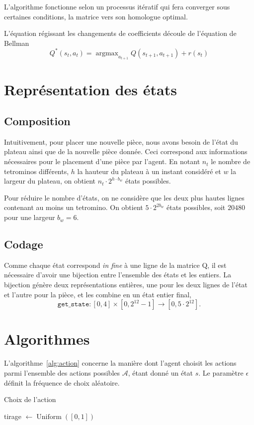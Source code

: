 \documentclass{report}
\DeclareMathOperator{\argmax}{argmax}
\DeclareMathOperator{\uniform}{Uniform}
\begin{document}
L'algorithme fonctionne selon un processus itératif qui fera converger sous
certaines conditions, la matrice vers son homologue optimal.

L'équation régissant les changements de coefficients découle de l'équation de
Bellman\cite{mengin}
\[
  Q^*(s_t, a_t) = \argmax_{a_{t+1}}Q(s_{t+1}, a_{t+1}) + r(s_t)
\]

\section{Représentation des états}

\subsection{Composition}
Intuitivement, pour placer une nouvelle pièce, nous avons besoin de l'état du
plateau ainsi que de la nouvelle pièce donnée. Ceci correspond aux informations
nécessaires pour le placement d'une pièce par l'agent. En notant \(n_t\) le nombre de tetrominos
différents, \( h \) la hauteur du plateau à un instant considéré  et \(w\) la
largeur du plateau, on obtient \(n_t \cdot 2^{h \cdot b_w}\) états possibles.

Pour réduire le nombre d'états, on ne considère que les deux plus hautes lignes
contenant au moins un tetromino. On obtient \(5\cdot 2^{2 b_w}\) états
possibles, soit \(20480\) pour une largeur \( b_w = 6 \).

\subsection{Codage}
Comme chaque état correspond \textit{in fine} à une ligne de la matrice Q, il est
nécessaire d'avoir une bijection entre l'ensemble des états et les entiers. La
bijection génère deux représentations entières, une pour les deux lignes de
l'état et l'autre pour la pièce, et les combine en un état entier final,
\[
  \texttt{get\_state}\colon [0,4]\times [0, 2^{12} - 1] \to [0, 5\cdot 2^{12}].
\]


\section{Algorithmes}\label{sec:algorithmes}

L'algorithme~\ref{alg:action} concerne la manière dont l'agent choisit les
actions parmi l'ensemble des actions possibles \(\mathcal{A}\), étant donné un
état \(s\). Le paramètre \(\epsilon\) définit la fréquence de choix aléatoire.
\begin{algorithm}
  \caption{Choix de l'action}\label{alg:action}
  \begin{algorithmic}
    [1]
    \State{} tirage \(\gets \uniform([0, 1])\)
    \Return{\(\argmax_{a\in\mathcal{A}} Q(s, a)\)}
    \Else{}
    \Return{\(\uniform(\mathcal{A})\)}
    \EndIf{}
    \EndProcedure{}
  \end{algorithmic}
\end{algorithm}
\end{document}
